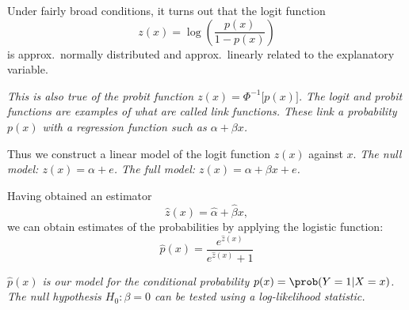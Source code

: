 Under fairly broad conditions, it turns out that the logit function
\[
z(x) = \log\left(\frac{p(x)}{1-p(x)}\right)
\]
is approx.\ normally distributed and approx.\ linearly related to the explanatory variable.

\bit
\it This is also true of the \emph{probit} function $z(x)=\Phi^{-1}\big[p(x)\big]$.
\it The logit and probit functions are examples of what are called \emph{link functions}.
\it These \emph{link} a probability $p(x)$ with a regression function such as $\alpha+\beta x$.
\eit


Thus we construct a linear model of the logit function $z(x)$ against $x$.
\bit
\it The \emph{null} model: $z(x) = \alpha + e$.
\it The \emph{full} model: $z(x) = \alpha + \beta x + e$.
\eit

\vspace*{2ex}
Having obtained an estimator 
\[
\hat{z}(x) = \hat{\alpha}+\hat{\beta}x,
\]
we can obtain estimates of the probabilities by applying the logistic function:
\[
\hat{p}(x) = \frac{e^{\hat{z}(x)}}{e^{\hat{z}(x)}+1} 
\]

\bit
\it $\hat{p}(x)$ is our model for the conditional probability $p(x)=\prob(Y=1|X=x)$.
\it The null hypothesis $H_0:\beta=0$ can be tested using a \emph{log-likelihood} statistic.
\eit



%
%
%

